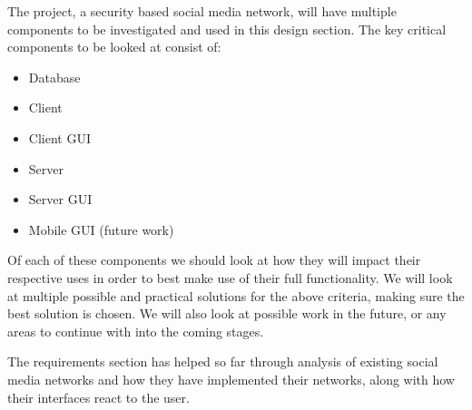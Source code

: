The project, a security based social media network, will have multiple 
components to be investigated and used in this design section. The key critical 
components to be looked at consist of:

\begin{itemize}
\item Database
\item Client
\item Client GUI
\item Server
\item Server GUI
\item Mobile GUI (future work)
\end{itemize}

Of each of these components we should look at how they will impact their 
respective uses in order to best make use of their full functionality. We will 
look at multiple possible and practical solutions for the above criteria, 
making sure the best solution is chosen. We will also look at possible work in 
the future, or any areas to continue with into the coming stages.

The requirements section has helped so far through analysis of existing social 
media networks and how they have implemented their networks, along with how 
their interfaces react to the user.

